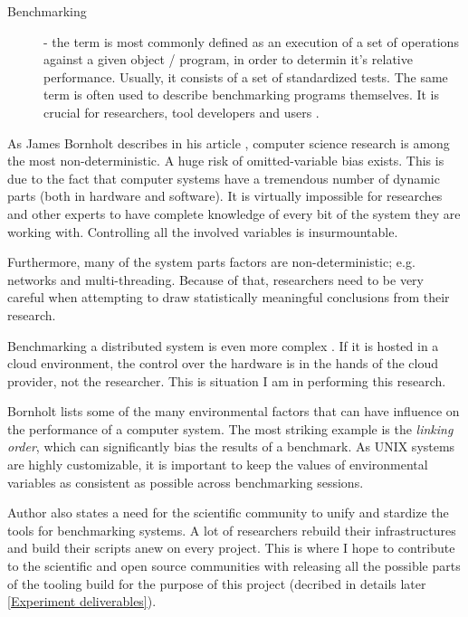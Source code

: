 \documentclass{uvamscse}
\begin{document}
\begin{description}
  \item[Benchmarking]
  - the term is most commonly defined as an execution of a set of operations against a given object / program, in order to determin it's relative performance. Usually, it consists of a set of standardized tests. The same term is often used to describe benchmarking programs themselves. It is crucial for researchers, tool developers and users \cite{BenRM}.
\end{description}

As James Bornholt describes in his article \cite{BornBen}, computer science research is among the most non-deterministic. A huge risk of omitted-variable bias exists. This is due to the fact that computer systems have a tremendous number of dynamic parts (both in hardware and software). It is virtually impossible for researches and other experts to have complete knowledge of every bit of the system they are working with. Controlling all the involved variables is insurmountable.

Furthermore, many of the system parts factors are non-deterministic; e.g. networks and multi-threading. Because of that, researchers need to be very careful when attempting to draw statistically meaningful conclusions from their research.

Benchmarking a distributed system is even more complex \cite{BornBen}. If it is hosted in a cloud environment, the control over the hardware is in the hands of the cloud provider, not the researcher. This is situation I am in performing this research.

Bornholt \cite{BornBen} lists some of the many environmental factors that can have influence on the performance of a computer system. The most striking example is the \textit{linking order}, which can significantly bias the results of a benchmark. As UNIX systems are highly customizable, it is important to keep the values of environmental variables as consistent as possible across benchmarking sessions.

Author also states a need for the scientific community to unify and stardize the tools for benchmarking systems. A lot of researchers rebuild their infrastructures and build their scripts anew on every project. This is where I hope to contribute to the scientific and open source communities with releasing all the possible parts of the tooling build for the purpose of this project (decribed in details later \ref{Experiment deliverables}).
\end{document}
